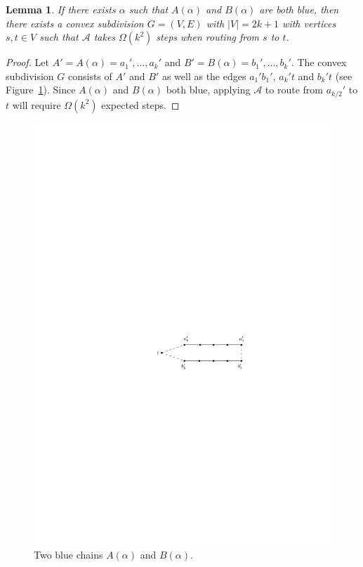 \documentclass [letterpaper] {patmorin}
\newtheorem{lemma}{Lemma}%
\begin{document}
\begin{lemma}\label{lem:2blue}
If there exists $\alpha$ such that $A(\alpha)$ and $B(\alpha)$ are both blue, then there exists a convex subdivision $G=(V,E)$ with $|V|=2k+1$ with vertices $s,t\in V$ such that $\mathcal{A}$ takes $\Omega(k^2)$ steps when routing from $s$ to $t$.  
\end{lemma} 

\begin{proof}
Let $A'=A(\alpha)=a_1',\ldots,a_k'$ and $B'=B(\alpha)=b_1',\ldots,b_k'$.  The convex subdivision $G$ consists of $A'$ and $B'$ as well as the edges $a_1'b_1'$, $a_k't$ and $b_k't$ (see Figure~\ref{fig:2blue}).  Since $A(\alpha)$ and $B(\alpha)$ both blue, applying $\mathcal{A}$ to route from $a_{k/2}'$ to $t$ will require $\Omega(k^2)$ expected steps.
\end{proof}

\begin{figure}
  \centering
  \includegraphics{pics/2blue.pdf}
  \caption{Two blue chains $A(\alpha)$ and $B(\alpha)$.}
  \label{fig:2blue}
\end{figure}
\end{document}
